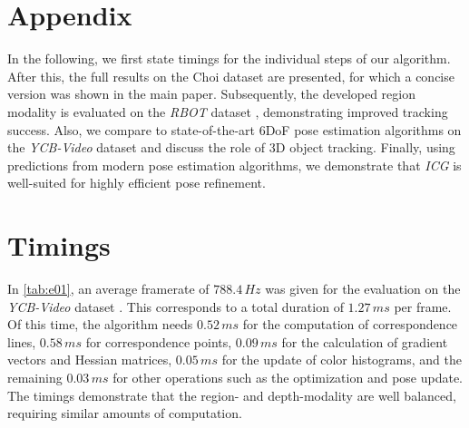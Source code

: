 \documentclass[10pt,twocolumn,letterpaper]{article}
\begin{document}
 

{\small


}


\vfill
\pagebreak
\appendix
\section*{Appendix}
In the following, we first state timings for the individual steps of our algorithm.
After this, the full results on the Choi dataset \cite{Choi2013} are presented, for which a concise version was shown in the main paper.
Subsequently, the developed region modality is evaluated on the \textit{RBOT} dataset \cite{Tjaden2018}, demonstrating improved tracking success.
Also, we compare to state-of-the-art \acs{6DoF} pose estimation algorithms on the \textit{YCB-Video} dataset \cite{Xiang2018} and discuss the role of 3D object tracking.
Finally, using predictions from modern pose estimation algorithms, we demonstrate that \textit{ICG} is well-suited for highly efficient pose refinement.



\section{Timings}\label{sec:a0}
In \cref{tab:e01}, an average framerate of $788.4\,\unit{Hz}$ was given for the evaluation on the \textit{YCB-Video} dataset \cite{Xiang2018}.
This corresponds to a total duration of $1.27\,\unit{ms}$ per frame.
Of this time, the algorithm needs $0.52\,\unit{ms}$ for the computation of correspondence lines, $0.58\,\unit{ms}$ for correspondence points, $0.09\,\unit{ms}$ for the calculation of gradient vectors and Hessian matrices, $0.05\,\unit{ms}$ for the update of color histograms, and the remaining $0.03\,\unit{ms}$ for other operations such as the optimization and pose update.
The timings demonstrate that the region- and depth-modality are well balanced, requiring similar amounts of computation.
\end{document}
